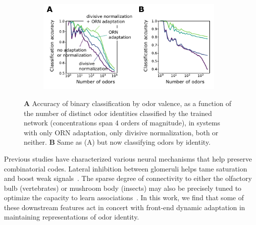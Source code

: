 \documentclass[9pt,twocolumn,twoside]{pnas-new}
\begin{document}
\begin{figure}[!t]
	\centering
	\begin{subfigure}[t]{\linewidth}
		\includegraphics[width=\textwidth]{figures/5_downstream}
		\label{fig:downstream_a}	
	\end{subfigure}
	\begin{subfigure}[t]{0\linewidth}
		\label{fig:downstream_b}
	\end{subfigure}
	\caption{\footnotesize{
	\textbf{A} Accuracy of binary classification by odor valence, as a function of the number of distinct odor identities classified by the trained network (concentrations span 4 orders of magnitude), in systems with only ORN adaptation, only divisive normalization, both or neither. \textbf{B} Same as (A) but now classifying odors  by identity.
	}}
	\label{fig:downstream}
\end{figure}


Previous studies have characterized various neural mechanisms that help preserve combinatorial codes. 
Lateral inhibition between glomeruli helps tame saturation and boost weak signals~\cite{divisive_normalization}. %
The sparse degree of connectivity to either the olfactory bulb (vertebrates) or mushroom body (insects) %
may also be precisely tuned to optimize the capacity to learn associations~\cite{litwinkumar}. In this work, we find that some of these downstream features act in concert with front-end dynamic adaptation in maintaining representations of odor identity.
\end{document}
